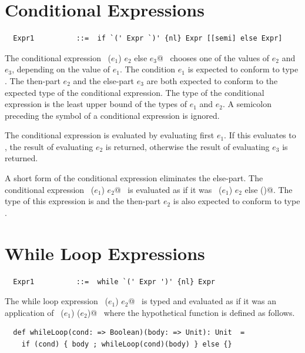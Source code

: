 \section{Conditional Expressions}\label{sec:cond}

\syntax\begin{lstlisting}
  Expr1          ::=  if `(' Expr `)' {nl} Expr [[semi] else Expr]
\end{lstlisting}

The conditional expression ~\lstinline@if ($e_1$) $e_2$ else $e_3$@~ chooses
one of the values of $e_2$ and $e_3$, depending on the
value of $e_1$. The condition $e_1$ is expected to
conform to type .  The then-part $e_2$ and the
else-part $e_3$ are both expected to conform to the expected
type of the conditional expression. The type of the conditional
expression is the least upper bound of the types of $e_1$ and
$e_2$.  A semicolon preceding the  symbol of a
conditional expression is ignored.

The conditional expression is evaluated by evaluating first
$e_1$. If this evaluates to , the result of
evaluating $e_2$ is returned, otherwise the result of
evaluating $e_3$ is returned.

A short form of the conditional expression eliminates the
else-part. The conditional expression ~\lstinline@if ($e_1$) $e_2$@~ is
evaluated as if it was ~\lstinline@if ($e_1$) $e_2$ else ()@.  The type of
this expression is  and the then-part
$e_2$ is also expected to conform to type .

\section{While Loop Expressions}\label{sec:while}

\syntax\begin{lstlisting}
  Expr1          ::=  while `(' Expr ')' {nl} Expr
\end{lstlisting}

The while loop expression ~\lstinline@while ($e_1$) $e_2$@~ is typed and
evaluated as if it was an application of ~\lstinline@whileLoop ($e_1$) ($e_2$)@~ where
the hypothetical function  is defined as follows.

\begin{lstlisting}
  def whileLoop(cond: => Boolean)(body: => Unit): Unit  =
    if (cond) { body ; whileLoop(cond)(body) } else {}
\end{lstlisting}

